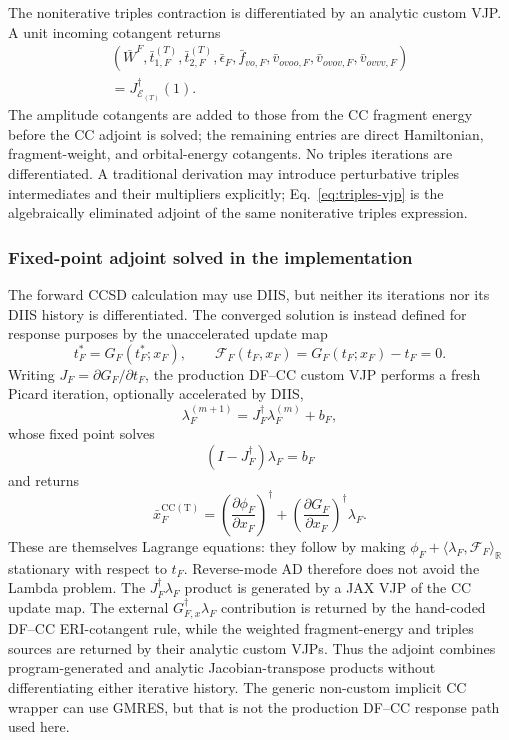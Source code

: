 \documentclass[11pt]{article}
\begin{document}
The noniterative triples contraction is differentiated by an analytic custom
VJP.  A unit incoming cotangent returns
\begin{multline}
 (\bar W^F,\bar t_{1,F}^{(T)},\bar t_{2,F}^{(T)},
  \bar\epsilon_F,\bar f_{vo,F},\bar v_{ovoo,F},
  \bar v_{ovov,F},\bar v_{ovvv,F})
 \\
 =J_{\mathcal E_{(T)}}^\dagger(1).
 \label{eq:triples-vjp}
\end{multline}
The amplitude cotangents are added to those from the CC fragment energy
before the CC adjoint is solved; the remaining entries are direct
Hamiltonian, fragment-weight, and orbital-energy cotangents.  No triples
iterations are differentiated.  A traditional derivation may introduce
perturbative triples intermediates and their multipliers explicitly;
Eq.~\eqref{eq:triples-vjp} is the algebraically eliminated adjoint of the same
noniterative triples expression.

\subsubsection{Fixed-point adjoint solved in the implementation}

The forward CCSD calculation may use DIIS, but neither its iterations nor its
DIIS history is differentiated.  The converged solution is instead defined
for response purposes by the unaccelerated update map
\begin{equation}
 t_F^*=G_F(t_F^*;x_F),
 \qquad
 \mathcal F_F(t_F,x_F)=G_F(t_F;x_F)-t_F=0.
 \label{eq:cc-fixed-point-residual}
\end{equation}
Writing $J_F=\partial G_F/\partial t_F$, the production DF--CC custom VJP
performs a fresh Picard iteration, optionally accelerated by DIIS,
\begin{equation}
 \lambda_F^{(m+1)}=J_F^\dagger\lambda_F^{(m)}+b_F,
 \label{eq:cc-fixed-point-iteration}
\end{equation}
whose fixed point solves
\begin{equation}
 (I-J_F^\dagger)\lambda_F=b_F
 \label{eq:cc-fixed-point-adjoint}
\end{equation}
and returns
\begin{equation}
 \bar x_F^{\mathrm{CC(T)}}
 =\left(\frac{\partial\phi_F}{\partial x_F}\right)^\dagger
  +\left(\frac{\partial G_F}{\partial x_F}\right)^\dagger\lambda_F.
 \label{eq:cc-fixed-point-pullback}
\end{equation}
These are themselves Lagrange equations: they follow by making
$\phi_F+\langle\lambda_F,\mathcal F_F\rangle_{\mathbb R}$ stationary with
respect to $t_F$.  Reverse-mode AD therefore does not avoid the Lambda
problem.  The $J_F^\dagger\lambda_F$ product is generated by a JAX VJP of the
CC update map.  The external $G_{F,x}^\dagger\lambda_F$ contribution is
returned by the hand-coded DF--CC ERI-cotangent rule, while the weighted
fragment-energy and triples sources are returned by their analytic custom
VJPs.  Thus the adjoint combines program-generated and analytic
Jacobian-transpose products without differentiating either iterative history.
The generic non-custom implicit CC wrapper can use GMRES, but that is not the
production DF--CC response path used here.
\end{document}
